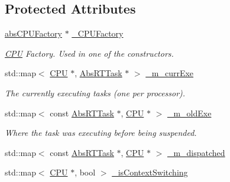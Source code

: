 \subsection*{Protected Attributes}
\begin{DoxyCompactItemize}
\item 
\hyperlink{classRTSim_1_1absCPUFactory}{abs\+C\+P\+U\+Factory} $\ast$ \hyperlink{classRTSim_1_1MRTKernel_a373a1adbd42000b91513ec766c65b038}{\+\_\+\+C\+P\+U\+Factory}\hypertarget{classRTSim_1_1MRTKernel_a373a1adbd42000b91513ec766c65b038}{}\label{classRTSim_1_1MRTKernel_a373a1adbd42000b91513ec766c65b038}

\begin{DoxyCompactList}\small\item\em \hyperlink{classRTSim_1_1CPU}{C\+PU} Factory. Used in one of the constructors. \end{DoxyCompactList}\item 
std\+::map$<$ \hyperlink{classRTSim_1_1CPU}{C\+PU} $\ast$, \hyperlink{classRTSim_1_1AbsRTTask}{Abs\+R\+T\+Task} $\ast$ $>$ \hyperlink{classRTSim_1_1MRTKernel_a2fc640eac40ed488b79f90061f640bff}{\+\_\+m\+\_\+curr\+Exe}\hypertarget{classRTSim_1_1MRTKernel_a2fc640eac40ed488b79f90061f640bff}{}\label{classRTSim_1_1MRTKernel_a2fc640eac40ed488b79f90061f640bff}

\begin{DoxyCompactList}\small\item\em The currently executing tasks (one per processor). \end{DoxyCompactList}\item 
std\+::map$<$ const \hyperlink{classRTSim_1_1AbsRTTask}{Abs\+R\+T\+Task} $\ast$, \hyperlink{classRTSim_1_1CPU}{C\+PU} $\ast$ $>$ \hyperlink{classRTSim_1_1MRTKernel_a19730467da360a5b5d30a03731867fa8}{\+\_\+m\+\_\+old\+Exe}\hypertarget{classRTSim_1_1MRTKernel_a19730467da360a5b5d30a03731867fa8}{}\label{classRTSim_1_1MRTKernel_a19730467da360a5b5d30a03731867fa8}

\begin{DoxyCompactList}\small\item\em Where the task was executing before being suspended. \end{DoxyCompactList}\item 
std\+::map$<$ const \hyperlink{classRTSim_1_1AbsRTTask}{Abs\+R\+T\+Task} $\ast$, \hyperlink{classRTSim_1_1CPU}{C\+PU} $\ast$ $>$ \hyperlink{classRTSim_1_1MRTKernel_af0023ed24a2bb68347cc8e1b758e02ee}{\+\_\+m\+\_\+dispatched}
\item 
std\+::map$<$ \hyperlink{classRTSim_1_1CPU}{C\+PU} $\ast$, bool $>$ \hyperlink{classRTSim_1_1MRTKernel_a85532e4ef383391213dae404e276b024}{\+\_\+is\+Context\+Switching}\hypertarget{classRTSim_1_1MRTKernel_a85532e4ef383391213dae404e276b024}{}\label{classRTSim_1_1MRTKernel_a85532e4ef383391213dae404e276b024}


\end{DoxyCompactItemize}
